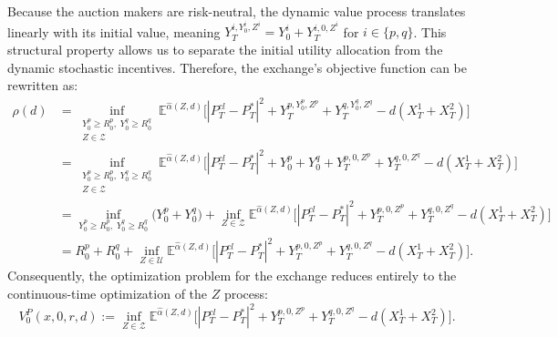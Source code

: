 \documentclass[12pt]{article}
\begin{document}
Because the auction makers are risk-neutral, the dynamic value process translates linearly with its initial value, meaning $Y_T^{i, Y_0^i, Z^i} = Y_0^i + Y_T^{i, 0, Z^i}$ for $i \in \{p,q\}$. This structural property allows us to separate the initial utility allocation from the dynamic stochastic incentives. Therefore, the exchange's objective function can be rewritten as:
\begin{align*}
    \rho(d) &= \inf_{\substack{Y^p_0 \geq R_0^p, \; Y^q_0 \geq R_0^q \\ Z \in \mathcal{Z}}} \mathbb{E}^{\hat{\alpha}(Z,d)}\Big[ |P^{cl}_T - P_T^{*}|^2 + Y_T^{p, Y_0^p, Z^p} + Y_T^{q, Y_0^q, Z^q} - d(X_T^1 + X_T^2) \Big] \\
    &= \inf_{\substack{Y^p_0 \geq R_0^p, \; Y^q_0 \geq R_0^q \\ Z \in \mathcal{Z}}} \mathbb{E}^{\hat{\alpha}(Z,d)}\Big[ |P^{cl}_T - P_T^{*}|^2 + Y_0^p + Y_0^q + Y_T^{p, 0, Z^p} + Y_T^{q, 0, Z^q} - d(X_T^1 + X_T^2) \Big] \\
    &= \inf_{Y^p_0 \geq R_0^p, \; Y^q_0 \geq R_0^q} \big( Y_0^p + Y_0^q \big) + \inf_{Z \in \mathcal{Z}} \mathbb{E}^{\hat{\alpha}(Z,d)}\Big[ |P^{cl}_T - P_T^{*}|^2 + Y_T^{p, 0, Z^p} + Y_T^{q, 0, Z^q} - d(X_T^1 + X_T^2) \Big] \\
    &= R_0^p + R_0^q + \inf_{Z \in \mathcal{U}} \mathbb{E}^{\hat{\alpha}(Z,d)}\Big[ |P^{cl}_T - P_T^{*}|^2 + Y_T^{p, 0, Z^p} + Y_T^{q, 0, Z^q} - d(X_T^1 + X_T^2) \Big].
\end{align*}
Consequently, the optimization problem for the exchange reduces entirely to the continuous-time optimization of the $Z$ process:
\begin{equation}\label{opt:tilderho} 
  V^P_0(x,0,r,d):=  \inf_{Z \in \mathcal{Z}} \mathbb{E}^{\hat{\alpha}(Z,d)}\Big[ |P^{cl}_T - P_T^{*}|^2 + Y_T^{p, 0, Z^p} + Y_T^{q, 0, Z^q} - d(X_T^1 + X_T^2) \Big].
\end{equation}
\end{document}
